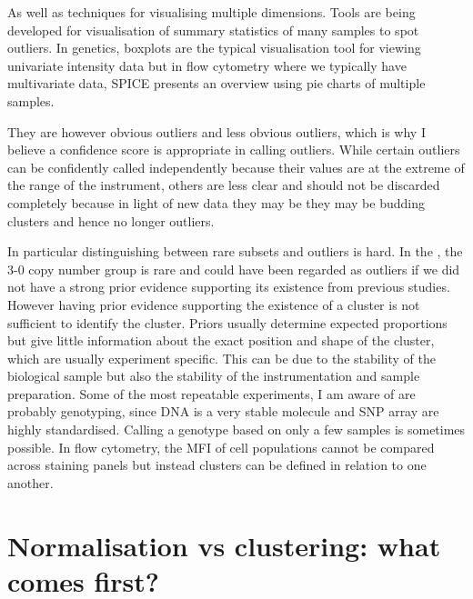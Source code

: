 As well as techniques for visualising multiple dimensions.
Tools are being developed for visualisation of summary statistics of many samples to spot outliers.
In genetics, boxplots are the typical visualisation tool for viewing univariate intensity data but in flow cytometry where we typically have multivariate data,
SPICE presents an overview using pie charts of multiple samples.

They are however obvious outliers and less obvious outliers, which is why I believe a confidence score is appropriate in calling outliers.
While certain outliers can be confidently called independently because their values are at the extreme of the range of the instrument,
others are less clear and should not be discarded completely because in light of new data they may be they may be budding clusters and hence no longer outliers.

In particular distinguishing between rare subsets and outliers is hard.
In the , the 3-0 copy number group is rare and could have been regarded as outliers if we did not have a strong prior evidence supporting its existence
from previous studies.
However having prior evidence supporting the existence of a cluster is not sufficient to identify the cluster.
Priors usually determine expected proportions but give little information about the exact position and shape of the cluster, which are usually experiment
specific.
This can be due to the stability of the biological sample but also the stability of the instrumentation and sample preparation.
Some of the most repeatable experiments, I am aware of are probably genotyping, since DNA is a very stable molecule and SNP array are highly standardised.
Calling a genotype based on only a few samples is sometimes possible.
In flow cytometry, the MFI of cell populations cannot be compared across staining panels but instead clusters can be defined in relation to one another.


\section{Normalisation vs clustering: what comes first?}

